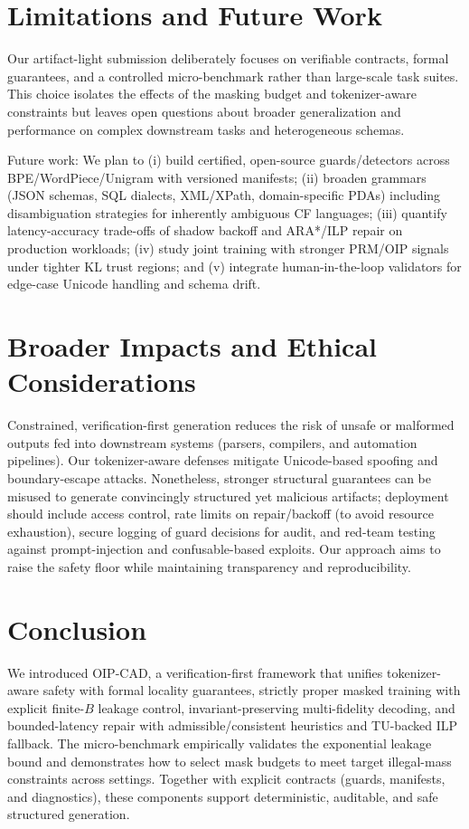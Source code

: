 \documentclass{article}
\begin{document}
\section{Limitations and Future Work}
Our artifact-light submission deliberately focuses on verifiable contracts, formal guarantees, and a controlled micro-benchmark rather than large-scale task suites. This choice isolates the effects of the masking budget and tokenizer-aware constraints but leaves open questions about broader generalization and performance on complex downstream tasks and heterogeneous schemas.

Future work: We plan to (i) build certified, open-source guards/detectors across BPE/WordPiece/Unigram with versioned manifests; (ii) broaden grammars (JSON schemas, SQL dialects, XML/XPath, domain-specific PDAs) including disambiguation strategies for inherently ambiguous CF languages; (iii) quantify latency-accuracy trade-offs of shadow backoff and ARA*/ILP repair on production workloads; (iv) study joint training with stronger PRM/OIP signals under tighter KL trust regions; and (v) integrate human-in-the-loop validators for edge-case Unicode handling and schema drift.

\section{Broader Impacts and Ethical Considerations}
Constrained, verification-first generation reduces the risk of unsafe or malformed outputs fed into downstream systems (parsers, compilers, and automation pipelines). Our tokenizer-aware defenses mitigate Unicode-based spoofing and boundary-escape attacks. Nonetheless, stronger structural guarantees can be misused to generate convincingly structured yet malicious artifacts; deployment should include access control, rate limits on repair/backoff (to avoid resource exhaustion), secure logging of guard decisions for audit, and red-team testing against prompt-injection and confusable-based exploits. Our approach aims to raise the safety floor while maintaining transparency and reproducibility.

\FloatBarrier
\clearpage
\section{Conclusion}
We introduced OIP-CAD, a verification-first framework that unifies tokenizer-aware safety with formal locality guarantees, strictly proper masked training with explicit finite-$B$ leakage control, invariant-preserving multi-fidelity decoding, and bounded-latency repair with admissible/consistent heuristics and TU-backed ILP fallback. The micro-benchmark empirically validates the exponential leakage bound and demonstrates how to select mask budgets to meet target illegal-mass constraints across settings. Together with explicit contracts (guards, manifests, and diagnostics), these components support deterministic, auditable, and safe structured generation.
\end{document}
